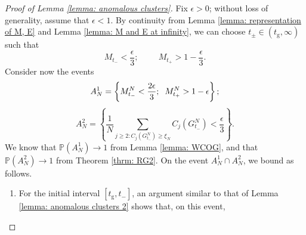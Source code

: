 \documentclass[11pt, notitlepage]{article}
\begin{document}
\begin{proof}[Proof of Lemma \ref{lemma: anomalous clusters}] Fix $\epsilon >0$; without loss of generality, assume that $\epsilon<1.$ By continuity from Lemma \ref{lemma: representation of M, E} and Lemma \ref{lemma: M and E at infinity}, we can choose $t_\pm \in (t_\mathrm{g}, \infty)$ such that \begin{equation}
    M_{t_-}<\frac{\epsilon}{3};\hspace{1cm}M_{t_+}>1-\frac{\epsilon}{3}.
\end{equation} Consider now the events \begin{equation}
    A^1_N=\left\{M^N_{t_-}<\frac{2\epsilon}{3}; \hspace{0.2cm} M^N_{t_+}>1-\epsilon \right\};
\end{equation} \begin{equation}
    A^2_N=\left\{\frac{1}{N}\sum_{j\geq 2: C_j(G^N_{t_-})\geq \xi_N} C_j(G^N_{t_-})<\frac{\epsilon}{3} \right\}.
\end{equation} We know that $\mathbb{P}(A^1_N)\rightarrow 1 $ from Lemma \ref{lemma: WCOG}, and that $\mathbb{P}(A^2_N)\rightarrow 1$ from Theorem \ref{thrm: RG2}. On the event $A^1_N \cap A^2_N$, we bound as follows. 
\begin{enumerate}[label=\roman{*}).]
    \item For the initial interval $[t_\mathrm{g}, t_-]$, an argument similar to that of Lemma \ref{lemma: anomalous clusters 2} shows that, on this event,
 

\end{enumerate}
\end{proof}
\end{document}
